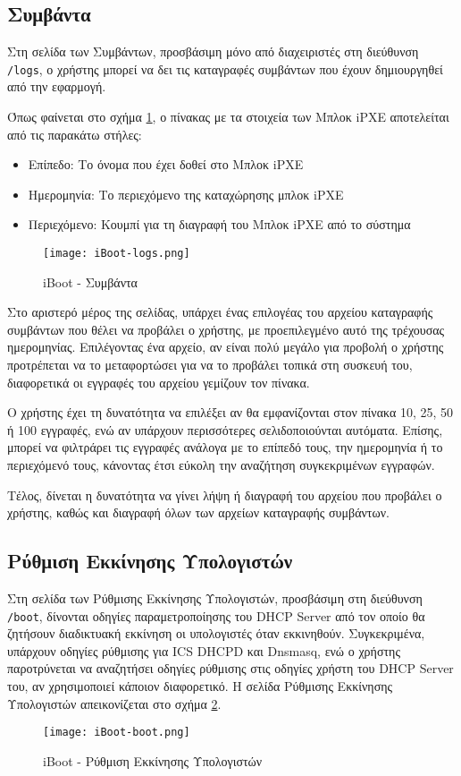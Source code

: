 \subsection{Συμβάντα}
\FloatBarrier
Στη σελίδα των Συμβάντων, προσβάσιμη μόνο από διαχειριστές στη διεύθυνση \verb!/logs!, ο χρήστης μπορεί να δει τις καταγραφές συμβάντων που έχουν δημιουργηθεί από την εφαρμογή.

Όπως φαίνεται στο σχήμα \ref{fig:iBoot_logs}, ο πίνακας με τα στοιχεία των Μπλοκ iPXE αποτελείται από τις παρακάτω στήλες:
\begin{itemize}
	\item Επίπεδο: Το όνομα που έχει δοθεί στο Μπλοκ iPXE
	\item Ημερομηνία: Το περιεχόμενο της καταχώρησης μπλοκ iPXE
	\item Περιεχόμενο: Κουμπί για τη διαγραφή του Μπλοκ iPXE από το σύστημα
\end{itemize}

\begin{figure}[ht]
	\centering
	\texttt{[image: iBoot-logs.png]}
	\caption{iBoot - Συμβάντα}
	\label{fig:iBoot_logs}
\end{figure}
Στο αριστερό μέρος της σελίδας, υπάρχει ένας επιλογέας του αρχείου καταγραφής συμβάντων που θέλει να προβάλει ο χρήστης, με προεπιλεγμένο αυτό της τρέχουσας ημερομηνίας. Επιλέγοντας ένα αρχείο, αν είναι πολύ μεγάλο για προβολή ο χρήστης προτρέπεται να το μεταφορτώσει για να το προβάλει τοπικά στη συσκευή του, διαφορετικά οι εγγραφές του αρχείου γεμίζουν τον πίνακα.

Ο χρήστης έχει τη δυνατότητα να επιλέξει αν θα εμφανίζονται στον πίνακα 10, 25, 50 ή 100 εγγραφές, ενώ αν υπάρχουν περισσότερες σελιδοποιούνται αυτόματα. Επίσης, μπορεί να φιλτράρει τις εγγραφές ανάλογα με το επίπεδό τους, την ημερομηνία ή το περιεχόμενό τους, κάνοντας έτσι εύκολη την αναζήτηση συγκεκριμένων εγγραφών.

Τέλος, δίνεται η δυνατότητα να γίνει λήψη ή διαγραφή του αρχείου που προβάλει ο χρήστης, καθώς και διαγραφή όλων των αρχείων καταγραφής συμβάντων.
\FloatBarrier

\subsection{Ρύθμιση Εκκίνησης Υπολογιστών}
\FloatBarrier
Στη σελίδα των Ρύθμισης Εκκίνησης Υπολογιστών, προσβάσιμη στη διεύθυνση \verb!/boot!, δίνονται οδηγίες παραμετροποίησης του DHCP Server από τον οποίο θα ζητήσουν διαδικτυακή εκκίνηση οι υπολογιστές όταν εκκινηθούν. Συγκεκριμένα, υπάρχουν οδηγίες ρύθμισης για ICS DHCPD και Dnsmasq, ενώ ο χρήστης παροτρύνεται να αναζητήσει οδηγίες ρύθμισης στις οδηγίες χρήστη του DHCP Server του, αν χρησιμοποιεί κάποιον διαφορετικό.
Η σελίδα Ρύθμισης Εκκίνησης Υπολογιστών απεικονίζεται στο σχήμα \ref{fig:iBoot_boot}.
\begin{figure}[ht]
	\centering
	\texttt{[image: iBoot-boot.png]}
	\caption{iBoot - Ρύθμιση Εκκίνησης Υπολογιστών}
	\label{fig:iBoot_boot}
\end{figure}
\FloatBarrier

